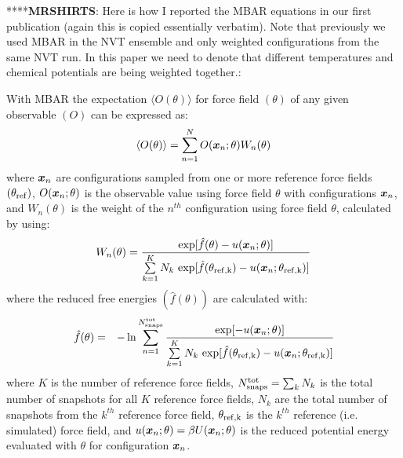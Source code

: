 \documentclass[journal=jced,manuscript=article]{achemso}
\newcommand{\bfv}[1]{{\mbox{\boldmath{$#1$}}}}
\newcommand{\x}{\bfv{x}}
\begin{document}

****\textbf{MRSHIRTS}: Here is how I reported the MBAR equations in our first publication (again this is copied essentially verbatim). Note that previously we used MBAR in the NVT ensemble and only weighted configurations from the same NVT run. In this paper we need to denote that different temperatures and chemical potentials are being weighted together.:

With MBAR the expectation $\langle O(\theta) \rangle$ for force field $(\theta)$ of any given observable $(O)$ can be expressed as:
\begin{eqnarray} \label{MBAR O theta_lit}
\langle O(\theta)\rangle = \sum_{n=1}^{N} O(\x_{n};\theta) W_{n}(\theta)
\end{eqnarray}
where $\x_n$ are configurations sampled from one or more reference force fields $(\theta_{\rm ref})$, %
$O(\x_{n};\theta)$ is the observable value using force field 
$\theta$ with configurations $\x_n$, and $W_{n}(\theta)$ is the weight of the $n^{th}$
configuration using force field $\theta$, calculated by using:
\begin{eqnarray} \label{MBAR weights theta_lit}
W_{n}(\theta) = \frac{\exp[\hat{f}(\theta)-u(\x_{n};\theta)]}{\sum\limits_{k=1}^K N_k \, \exp[\hat{f}(\theta_{\rm ref,k}) - u(\x_{n};\theta_{\rm ref,k})]}
\end{eqnarray}
where the reduced free energies $(\hat f(\theta))$ are calculated with:
\begin{eqnarray} \label{MBAR free energy theta_lit}
\hat f(\theta) &=& - \ln \sum_{n=1}^{N^{\rm tot}_{\rm snaps}}
\frac{\exp[-u(\x_{n};\theta)]}{\sum\limits_{k=1}^K N_k \, \exp[\hat{f}(\theta_{\rm ref,k}) - u(\x_{n};\theta_{\rm ref,k})]} 
\end{eqnarray}
where $K$ is the number of reference force fields, $N^{\rm tot}_{\rm snaps} = \sum_k N_k$ is the total number of snapshots for all $K$ reference force fields, $N_k$ are the total number of snapshots from the $k^{th}$ reference force field, $\theta_{\rm ref,k}$ is the $k^{th}$ reference (i.e. simulated) force field, and $u(\x_{n};\theta) = \beta U(\x_n;\theta)$ is the reduced potential energy evaluated with $\theta$ for configuration $\x_n$. 
\end{document}
